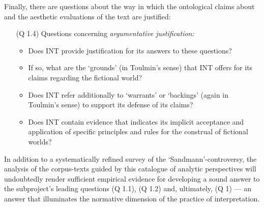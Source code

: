 \noindent Finally, there are questions about the way in which the ontological claims about and the aesthetic evaluations of the text are justified:

\vspace{-.1cm}
\begin{itemize}[leftmargin=2cm]
\item[(Q 1.4)] Questions concerning \emph{argumentative justification:}
\begin{itemize}
\vspace{-.2cm}
\item Does INT provide justification for its answers to these questions? 
\vspace{-.1cm}
\item If so, what are the `grounds' (in Toulmin's sense) that INT offers for its claims regarding the fictional world?
\vspace{-.1cm}
\item Does INT refer additionally to `warrants' or `backings' (again in Toulmin's sense) to support its defense of its claims?
\vspace{-.1cm}
\item Does INT contain evidence that indicates its implicit acceptance and application of specific principles and rules for the construal of fictional worlds?
\end{itemize}
\end{itemize}
\vspace{-.3cm}

\noindent In addition to a systematically refined survey of the `Sandmann'-controversy, the analysis of the corpus-texts guided by this catalogue of analytic perspectives will undoubtedly render sufficient empirical evidence for developing a sound answer to the subproject's leading questions (Q 1.1), (Q 1.2) and, ultimately, (Q 1) --- an answer that illuminates the normative dimension of the practice of interpretation.

